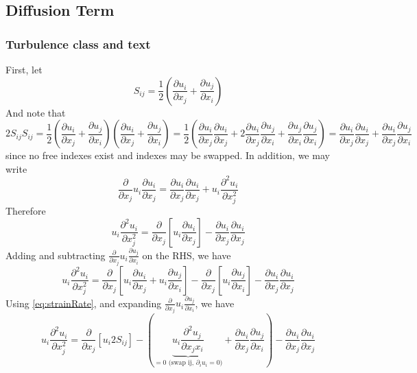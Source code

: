 \documentclass[11pt]{article}
\newcommand{\PD}{\partial}
\begin{document}
\subsection{Diffusion Term}
\subsubsection{Turbulence class and text}
First, let
\begin{equation} \label{eq:strainRate}
	S_{ij} = \frac{1}{2}
	\left(
	\frac{\PD u_i}{\PD x_j} + 
	\frac{\PD u_j}{\PD x_i}
	\right)
\end{equation}
And note that
\begin{equation} \label{eq:strainIdentity}
	2 S_{ij} S_{ij} =
	\frac{1}{2} \left( \frac{\PD u_i}{\PD x_j} + \frac{\PD u_j}{\PD x_i} \right)
	\left( \frac{\PD u_i}{\PD x_j} + \frac{\PD u_j}{\PD x_i} \right)
	= \frac{1}{2} \left( \frac{\PD u_i}{\PD x_j} \frac{\PD u_i}{\PD x_j}
	+ 2 \frac{\PD u_i}{\PD x_j} \frac{\PD u_j}{\PD x_i} 
	+ \frac{\PD u_j}{\PD x_i} \frac{\PD u_j}{\PD x_i} \right)
	= \frac{\PD u_i}{\PD x_j} \frac{\PD u_i}{\PD x_j}
	+ \frac{\PD u_i}{\PD x_j} \frac{\PD u_j}{\PD x_i}
\end{equation}
since no free indexes exist and indexes may be swapped. In addition, we may write
\begin{equation}
	\frac{\PD}{\PD x_j} u_i \frac{\PD u_i}{\PD x_j} =
	\frac{\PD u_i}{\PD x_j}\frac{\PD u_i}{\PD x_j} + 
	u_i \frac{\PD^2 u_i}{\PD x_j^2}
\end{equation}
Therefore
\begin{equation} \label{eq:secondIdentity}
	u_i \frac{\PD^2 u_i}{\PD x_j^2} = 
	\frac{\PD}{\PD x_j} \left[ u_i \frac{\PD u_i}{\PD x_j} \right] - 
	\frac{\PD u_i}{\PD x_j}\frac{\PD u_i}{\PD x_j}
\end{equation}
Adding and subtracting $\frac{\PD}{\PD x_j} u_i \frac{\PD u_j}{\PD x_i}$ on the RHS, we have
\begin{equation}
	u_i \frac{\PD^2 u_i}{\PD x_j^2} = 
	\frac{\PD}{\PD x_j} \left[ u_i \frac{\PD u_i}{\PD x_j} + u_i \frac{\PD u_j}{\PD x_i} \right] - 
	\frac{\PD}{\PD x_j} \left[ u_i \frac{\PD u_j}{\PD x_i} \right] - 
	\frac{\PD u_i}{\PD x_j}\frac{\PD u_i}{\PD x_j}
\end{equation}
Using \ref{eq:strainRate}, and expanding $\frac{\PD}{\PD x_j} u_i \frac{\PD u_j}{\PD x_i}$, we have
\begin{equation}
	u_i \frac{\PD^2 u_i}{\PD x_j^2} = 
	\frac{\PD}{\PD x_j} \left[ u_i 2 S_{ij} \right] - 
	\left( 
	\underbrace{u_i \frac{\PD^2 u_j}{\PD x_j x_i}}_{=0 \text{ (swap ij, $\PD_i u_i =0$)}}
	+
	\frac{\PD u_i}{\PD x_j} \frac{\PD u_j}{\PD x_i}
	\right) - 
	\frac{\PD u_i}{\PD x_j}\frac{\PD u_i}{\PD x_j}
\end{equation}
\end{document}

